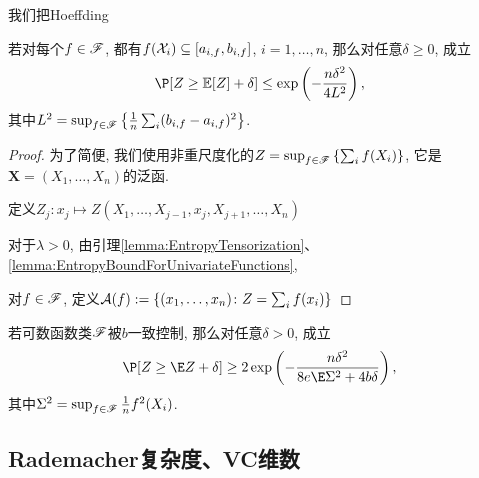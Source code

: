 我们把Hoeffding

\begin{theorem}[泛函Hoeffding不等式]
	若对每个$f \in \mathscr{F}$, 都有$f(\mathcal{X}_i) \subseteq  [a_{i, f}, b_{i, f}]$, $i = 1, \dots, n$,  那么对任意$\delta \geq 0$, 成立
	\begin{equation}
		\P[ Z \geq \mathbb{E}[Z] + \delta] 
		\leq \exp \left( - \frac{n \delta^2}{4 L^2} \right), 
	\end{equation}
	其中$L^2 = \sup_{f \in \mathscr{F}} \left\{ \frac{1}{n} \sum_i (b_{i, f} - a_{i, f})^2 \right\}$. 
\end{theorem}

\begin{proof}
	为了简便, 我们使用非重尺度化的$Z = \sup_{f \in \mathscr{F}} \left\{ \sum_i f(X_i) \right\}$, 它是$\bm X = (X_1, \dots, X_n)$的泛函.  
	
	定义$Z_j \colon x_j \mapsto Z(X_1, \dots, X_{j-1}, x_j, X_{j+1}, \dots, X_n)$
	
	对于$\lambda > 0$, 由引理\ref{lemma:EntropyTensorization}、 \ref{lemma:EntropyBoundForUnivariateFunctions}, 
	
	对$f \in \mathscr{F}$, 定义$\mathcal{A}(f) := \left\{ (x_1, \dots, x_n) \colon Z = \sum_i f(x_i) \right\}$
\end{proof}


\begin{theorem}[经验过程的Talagrand集中度]
	若可数函数类$\mathscr{F}$被$b$一致控制, 那么对任意$\delta > 0$, 成立
	\begin{equation*}
		\P[ Z \geq \E Z + \delta] 
		\geq 2 \exp \left( - \frac{n \delta^2}{8 e \E \Sigma^2 + 4 b \delta} \right), 
	\end{equation*}
	其中$\Sigma^2 = \sup_{f \in \mathscr{F}} \frac1n f^2(X_i)$. 
\end{theorem}

\subsection{Rademacher复杂度、VC维数}

